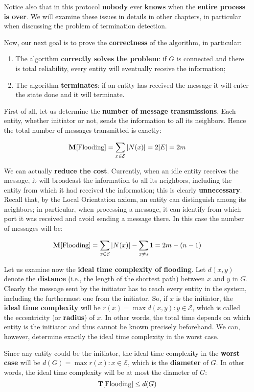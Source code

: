 Notice also that in this protocol \textbf{nobody} ever \textbf{knows} when the \textbf{entire process is over}. We will examine these issues in details in other chapters, in particular when discussing the problem of termination detection.

Now, our next goal is to prove the \textbf{correctness} of the algorithm, in particular:
\begin{enumerate}
    \item The algorithm \textbf{correctly solves the problem}: if $G$ is connected and there is total reliability, every entity will eventually receive the information;
    \item The algorithm \textbf{terminates}: if an entity has received the message it will enter the state done and it will terminate.
\end{enumerate}

First of all, let us determine the \textbf{number of message transmissions}. Each entity, whether initiator or not, sends the information to all its neighbors. Hence the total number of messages transmitted is exactly:

$$\mathbf{M}[\text{Flooding}] = \sum_{x \in \mathcal{E}} |N(x)|= 2 |E|= 2 m$$

We can actually \textbf{reduce the cost}. Currently, when an idle entity receives the message, it will broadcast the information to all its neighbors, including the entity from which it had received the information; this is clearly \textbf{unnecessary}. Recall that, by the Local Orientation axiom, an entity can distinguish among its neighbors; in particular, when processing a message, it can identify from which port it was received and avoid sending a message there. In this case the number of messages will be:

$$
\mathbf{M}[\text{Flooding}] = \sum_{x \in \mathcal{E}} |N(x)| - \sum_{x \neq s} 1 = 2m - (n-1)
$$

Let us examine now the \textbf{ideal time complexity of flooding}. Let $d(x, y)$ denote the \textbf{distance} (i.e., the length of the shortest path) between $x$ and $y$ in $G$. Clearly the message sent by the initiator has to reach every entity in the system, including the furthermost one from the initiator. So, if $x$ is the initiator, the \textbf{ideal time complexity} will be $r(x) = \max {d(x, y): y \in \mathcal{E}}$, which is called the eccentricity (or \textbf{radius}) of $x$. In other words, the total time depends on which entity is the initiator and thus cannot be known precisely beforehand. We can, however, determine exactly the ideal time complexity in the worst case. 

Since any entity could be the initiator, the ideal time complexity in the \textbf{worst case} will be $d(G) = \max {r(x): x \in \mathcal{E}}$, which is the \textbf{diameter} of $G$. In other words, the ideal time complexity will be at most the diameter of $G$:
$$\mathbf{T}[\text{Flooding}] \leq d(G)$$